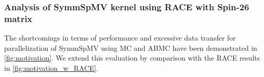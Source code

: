 \subsubsection{Analysis of \acrshort{SymmSpMV} kernel using RACE with Spin-26 matrix}
\label{Sec:Spin26full}
%
The shortcomings in terms of performance and excessive data transfer for parallelization of \acrshort{SymmSpMV} using MC and ABMC have been demonstrated in \cref{fig:motivation}. We extend this evaluation by comparison with the \acrshort{RACE} results in \cref{fig:motivation_w_RACE}.
 \begin{figure}[tbp]
 	\centering

\end{figure}
